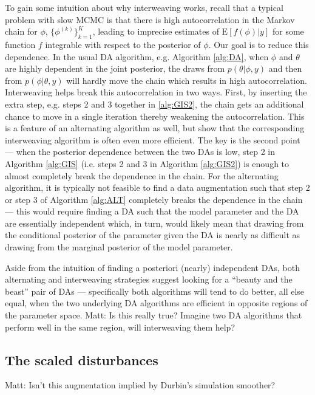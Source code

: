 \documentclass{article}
\newcommand{\matt}[1]{{\color{red} Matt: #1}}
\begin{document}
To gain some intuition about why interweaving works, recall that a typical problem with slow MCMC is that there is high autocorrelation in the Markov chain for $\phi$, $\{\phi^{(k)}\}_{k=1}^K$, leading to imprecise estimates of $\mathrm{E}[f(\phi)|y]$ for some function $f$ integrable with respect to the posterior of $\phi$. Our goal is to reduce this dependence. In the usual DA algorithm, e.g. Algorithm \ref{alg:DA}, when $\phi$ and $\theta$ are highly dependent in the joint posterior, the draws from $p(\theta|\phi,y)$ and then from $p(\phi|\theta,y)$ will hardly move the chain which results in high autocorrelation. Interweaving helps break this autocorrelation in two ways. First, by inserting the extra step, e.g. steps 2 and 3 together in \ref{alg:GIS2}, the chain gets an additional chance to move in a single iteration thereby weakening the autocorrelation. This is a feature of an alternating algorithm as well, but \citet{yu2011center} show that the corresponding interweaving algorithm is often even more efficient. The key is the second point --- when the posterior dependence between the two DAs is low, step 2 in Algorithm \ref{alg:GIS} (i.e. steps 2 and 3 in Algorithm \ref{alg:GIS2}) is enough to almost completely break the dependence in the chain. For the alternating algorithm, it is typically not feasible to find a data augmentation such that step 2 or step 3 of Algorithm \ref{alg:ALT} completely breaks the dependence in the chain --- this would require finding a DA such that the model parameter and the DA are essentially independent which, in turn, would likely mean that drawing from the conditional posterior of the parameter given the DA is nearly as difficult as drawing from the marginal posterior of the model parameter.

Aside from the intuition of finding a posteriori (nearly) independent DAs, both alternating and interweaving strategies suggest looking for a ``beauty and the beast'' pair of DAs --- specifically both algorithms will tend to do better, all else equal, when the two underlying DA algorithms are efficient in opposite regions of the parameter space. \matt{Is this really true? Imagine two DA algorithms that perform well in the same region, will interweaving them help?}

\subsection{The scaled disturbances} \matt{Isn't this augmentation implied by Durbin's simulation smoother?}
\end{document}

